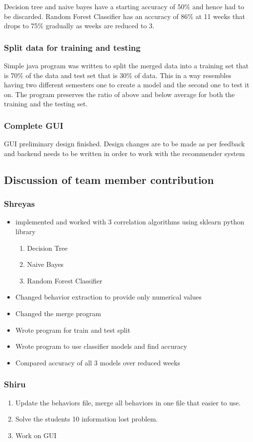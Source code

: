 \documentclass[12pt]{article}
\begin{document}
	Decision tree and naive bayes have a starting accuracy of 50\% and hence had to be discarded. Random Forest Classifier has an accuracy of 86\% at 11 weeks that drops to 75\% gradually as weeks are reduced to 3.
	
	\subsubsection{Split data for training and testing}
	Simple java program was written to split the merged data into a training set that is 70\% of the data and test set that is 30\% of data. This in a way resembles having two different semesters one to create a model and the second one to test it on. The program preserves the ratio of above and below average for both the training and the testing set.
	\subsubsection{Complete GUI}
	GUI preliminary design finished. Design changes are to be made as per feedback and backend needs to be written in order to work with the recommender system
	\subsection{Discussion of team member contribution}
	\subsubsection{Shreyas}
	\begin{itemize}
		\item implemented and worked with 3 correlation algorithms using sklearn python library
		\begin{enumerate}
		\item Decision Tree
		\item Naive Bayes
		\item Random Forest Classifier
		\end{enumerate}
		\item Changed behavior extraction to provide only numerical values
		\item Changed the merge program
		\item Wrote program for train and test split
		\item Wrote program to use classifier models and find accuracy
		\item Compared accuracy of all 3 models over reduced weeks
	\end{itemize}
	\subsubsection{Shiru}
	\begin{enumerate}
		\item Update the behaviors file, merge all behaviors in one file that easier to use. 
		\item Solve the students 10 information lost problem. 
		\item Work on GUI
	\end{enumerate}
	
\end{document}
